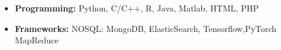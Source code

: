 
\begin{itemize}
    \item \textbf{Programming:} Python, C/C++, R, Java, Matlab,
  HTML, PHP

  \item \textbf{Frameworks:} NOSQL: MongoDB, ElasticSearch, Tensorflow,PyTorch
  MapReduce
\end{itemize}

